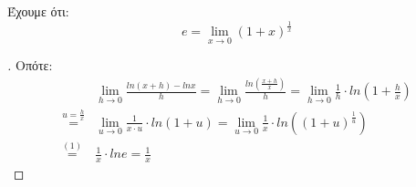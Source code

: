 \setcounter{equation}{0}
        
\question  
        
\textgreek{Έχουμε ότι: }
\begin{equation}
    e = \lim_{x\to0}(1+x)^\frac{1}{x}
\end{equation}
\begin{proof}[\unskip\nopunct]

\textgreek{Οπότε: }
\begin{align*}
    &\lim_{h\to0}\frac{ln(x+h) - lnx}{h} = \lim_{h\to0}\frac{ln(\frac{x+h}{x})}{h} = \lim_{h\to0}\frac{1}{h}\cdot ln(1 + \frac{h}{x})\\
    \overset{u=\frac{h}{x}}{=} &\lim_{u\to0}\frac{1}{x\cdot u}\cdot ln(1 + u) = \lim_{u\to0}\frac{1}{x}\cdot ln((1 + u)^\frac{1}{u})\\
    \overset{\mathrm{(1)}}{=} &\frac{1}{x}\cdot lne = \frac{1}{x}
\end{align*}
\end{proof}